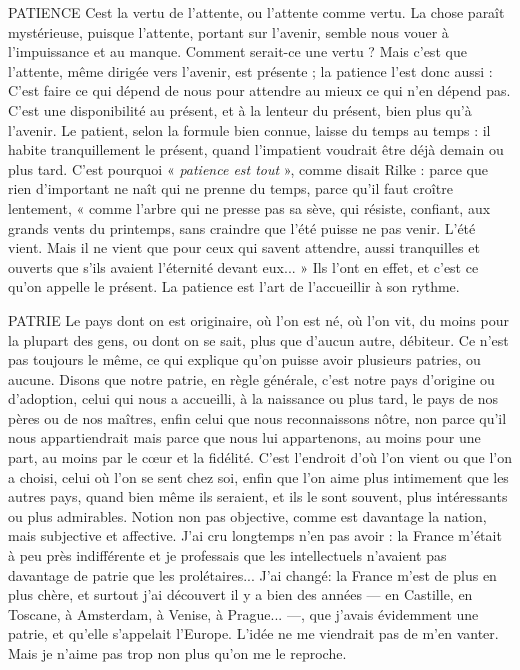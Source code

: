 PATIENCE Cest la vertu de l’attente, ou l’attente comme vertu. La chose
paraît mystérieuse, puisque l'attente, portant sur l'avenir, semble
nous vouer à l'impuissance et au manque. Comment serait-ce une vertu ? Mais
c'est que l'attente, même dirigée vers l'avenir, est présente ; la patience l’est donc
aussi : C’est faire ce qui dépend de nous pour attendre au mieux ce qui n'en
dépend pas. C’est une disponibilité au présent, et à la lenteur du présent, bien
plus qu’à l'avenir. Le patient, selon la formule bien connue, laisse du temps au
temps : il habite tranquillement le présent, quand l’impatient voudrait être déjà
demain ou plus tard. C’est pourquoi « {\it patience est tout} », comme disait Rilke :
parce que rien d’important ne naît qui ne prenne du temps, parce qu'il faut
croître lentement, « comme l'arbre qui ne presse pas sa sève, qui résiste, confiant,
aux grands vents du printemps, sans craindre que l’été puisse ne pas venir. L'été
vient. Mais il ne vient que pour ceux qui savent attendre, aussi tranquilles et
ouverts que s’ils avaient l'éternité devant eux... » Ils l'ont en effet, et c'est ce
qu’on appelle le présent. La patience est l’art de l’accueillir à son rythme.

PATRIE Le pays dont on est originaire, où l’on est né, où l’on vit, du moins
pour la plupart des gens, ou dont on se sait, plus que d’aucun
autre, débiteur. Ce n’est pas toujours le même, ce qui explique qu’on puisse
avoir plusieurs patries, ou aucune. Disons que notre patrie, en règle générale,
c'est notre pays d’origine ou d’adoption, celui qui nous a accueilli, à la naissance
ou plus tard, le pays de nos pères ou de nos maîtres, enfin celui que nous
reconnaissons nôtre, non parce qu’il nous appartiendrait mais parce que nous
lui appartenons, au moins pour une part, au moins par le cœur et la fidélité.
C’est l'endroit d’où l’on vient ou que l’on a choisi, celui où l’on se sent chez soi,
enfin que l’on aime plus intimement que les autres pays, quand bien même ils
seraient, et ils le sont souvent, plus intéressants ou plus admirables. Notion non
pas objective, comme est davantage la nation, mais subjective et affective. J'ai
cru longtemps n’en pas avoir : la France m'était à peu près indifférente et je
professais que les intellectuels n’avaient pas davantage de patrie que les prolétaires...
J'ai changé: la France m’est de plus en plus chère, et surtout j'ai
découvert il y a bien des années — en Castille, en Toscane, à Amsterdam, à
Venise, à Prague... —, que j'avais évidemment une patrie, et qu’elle s'appelait
l'Europe. L'idée ne me viendrait pas de m’en vanter. Mais je n'aime pas trop
non plus qu’on me le reproche.

